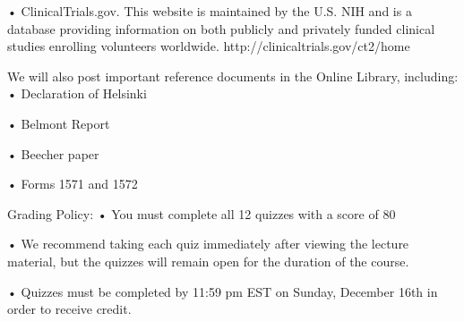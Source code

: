 •
ClinicalTrials.gov. This website is maintained by the U.S. NIH and is a database providing information on both publicly and privately funded clinical studies enrolling volunteers worldwide. http://clinicaltrials.gov/ct2/home


We will also post important reference documents in the Online Library, including:
•
Declaration of Helsinki

•
Belmont Report

•
Beecher paper

•
Forms 1571 and 1572


Grading Policy:
•
You must complete all 12 quizzes with a score of 80%

•
We recommend taking each quiz immediately after viewing the lecture material, but the quizzes will remain open for the duration of the course.

•
Quizzes must be completed by 11:59 pm EST on Sunday, December 16th in order to receive credit.



